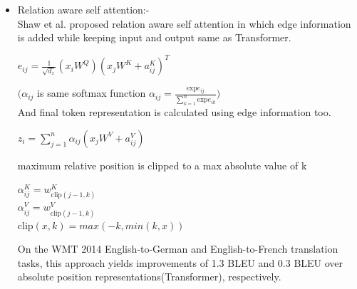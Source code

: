 \documentclass{article}
\begin{document}
\begin{multicols}{2}
\begin{itemize}
   \item Relation aware self attention:- \\
   Shaw et al. \cite{shaw2018selfattention} proposed relation aware self attention in which edge information is added while keeping input and output same as Transformer.
    \begin{center}
       $e_{ij} = \frac{1}{\sqrt{d_z}}(x_iW^Q)(x_jW^K+a_{ij}^K)^T$
   \end{center}
  $\Big( \alpha _{ij}$ is same softmax function  $\alpha _{ij} = \frac{\text{exp}e_{ij}}{\sum_{k=1}^{n} \text{exp}e_{ik}}\Big)$ \\
  
  \noindent And final token representation is calculated using edge information too.
   \begin{center}
      $z_i = \sum_{j=1}^{n} \alpha _{ij}(x_jW^V+a_{ij}^V)$
   \end{center}
   maximum relative position is clipped to a max absolute value of k
 \begin{center}
      $ \alpha _{ij}^K = w_{\text{clip}(j-1,k)}^K$\\
       $ \alpha _{ij}^V = w_{\text{clip}(j-1,k)}^V$\\
       $ \text{clip}(x,k) = max(-k, min(k,x))$
   \end{center}
   On the WMT 2014 English-to-German and English-to-French translation tasks, this approach yields improvements of 1.3 BLEU and 0.3 BLEU over absolute position representations(Transformer), respectively.
\end{itemize}

    
	
    
	
	\end{multicols}
\end{document}
